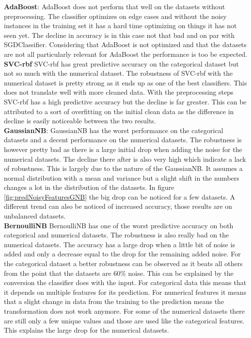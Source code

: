 \documentclass[a4paper,10pt]{article}
\begin{document}
\textbf{AdaBoost}: AdaBoost does not perform that well on the datasets without preprocessing. The classifier optimizes on edge cases and without the noisy instances in the training set it has a hard time optimizing on things it has not seen yet. The decline in accuracy is in this case not that bad and on par with SGDClassifier. Considering that AdaBoost is not optimized and that the datasets are not all particularly relevant for AdaBoost the performance is too be expected.\\

\textbf{SVC-rbf} SVC-rbf has great predictive accuracy on the categorical dataset but not so much with the numerical dataset. The robustness of SVC-rbf with the numerical dataset is pretty strong as it ends up as one of the best classifiers. This does not translate well with more cleaned data. With the preprocessing steps SVC-rbf has a high predictive accuracy but the decline is far greater. This can be attributed to a sort of overfitting on the initial clean data as the difference in decline is easily noticeable between the two results. \\

\textbf{GaussianNB}: GaussianNB has the worst performance on the categorical datasets and a decent performance on the numerical datasets. The robustness is however pretty bad as there is a large initial drop when adding the noise for the numerical datasets. The decline there after is also very high which indicate a lack of robustness. This is largely due to the nature of the GaussianNB. It assumes a normal distribution with a mean and variance but a slight shift in the numbers changes a lot in the distribution of the datasets. In figure \ref{fig:predNoisyFeaturesGNB} the big drop can be noticed for a few datasets. A different trend can also be noticed of increased accuracy, those results are on unbalanced datasets. \\

\textbf{BernoulliNB} BernoulliNB has one of the worst predictive accuracy on both categorical and numerical datasets. The robustness is also really  bad on the numerical datasets. The accuracy has a large drop when a little bit of noise is added and only a decrease equal to the drop for the remaining added noise. For the categorical dataset a better robustness can be observed as it beats all others from the point that the datasets are 60$\%$ noise. This can be explained by the conversion the classifier does with the input. For categorical data this means that it depends on multiple features for its prediction. For numerical features it means that a slight change in data from the training to the prediction means the transformation does not work anymore. For some of the numerical datasets there are still only a few unique values and those are used like the categorical features. This explains the large drop for the numerical datasets.  \\
\end{document}
